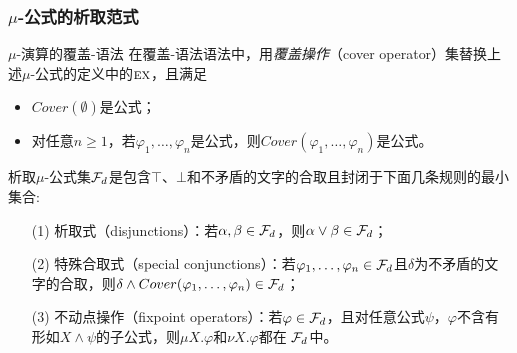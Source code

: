 \documentclass[9pt, CJK]{beamer}
\begin{document}
\begin{frame}
	\frametitle{$\mu$-公式的析取范式}
	{\footnotesize
		\begin{block}{$\mu$-演算的覆盖-语法}
			在覆盖-语法语法中，用\emph{覆盖操作}（cover operator）集替换上述$\mu$-公式的定义中的$\textsc{e}\textsc{x}$，且满足
			\begin{itemize}
				\item $Cover(\emptyset)$是公式；
				\item 对任意$n\geq 1$，若$\varphi_1,\dots, \varphi_n$是公式，则$Cover(\varphi_1, \dots, \varphi_n)$是公式。
			\end{itemize}
		\end{block}
		\begin{definition}
			析取$\mu$-公式集${\cal F}_d$是包含$\top$、$\bot$和不矛盾的文字的合取且封闭于下面几条规则的最小集合:
			\begin{itemize}
				\item[(1)] 析取式（disjunctions）：若$\alpha, \beta \in {\cal F}_d$，则$\alpha \vee \beta \in {\cal F}_d$；
				\item[(2)] 特殊合取式（special conjunctions）：若$\varphi_1, \dots, \varphi_n\in {\cal F}_d$且$\delta$为不矛盾的文字的合取，则$\delta \wedge Cover(\varphi_1, \dots, \varphi_n) \in {\cal F}_d$；
				\item[(3)] 不动点操作（fixpoint operators）：若$\varphi\in  {\cal F}_d$，且对任意公式$\psi$，$\varphi$不含有形如$X \wedge \psi$的子公式，则$\mu X. \varphi$和$\nu X. \varphi$都在 ${\cal F}_d$中。
			\end{itemize}	
		\end{definition}
	}
\end{frame}
	
\end{document}
